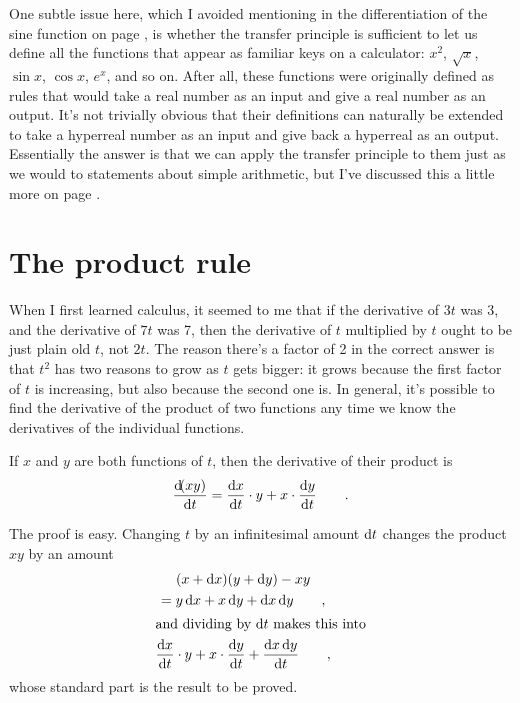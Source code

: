 \label{transcendentals}
One subtle issue here, which I avoided mentioning in the differentiation of the sine function on page \pageref{eg:derivative-of-sin},
is whether the transfer principle is sufficient to let us define all the functions that
appear as familiar keys on a calculator: $x^2$, $\sqrt{x}$, $\sin x$, $\cos x$, $e^x$, and so on.
After all, these functions were originally defined as rules that would take a real number as an input
and give a real number as an output. It's not trivially obvious that their definitions can naturally be extended
to take a hyperreal number as an input and give back a hyperreal as an output. Essentially the answer is that
we can apply the transfer principle to them just as we would to statements about simple arithmetic, but I've discussed
this a little more on page \pageref{detour:transcendentals}.

\section{The product rule}

When I first learned calculus, it seemed to me that if the derivative of $3t$ was $3$, and the derivative of
$7t$ was 7, then the derivative of $t$ multiplied by $t$ ought to be just plain old $t$, not $2t$. The reason there's
a factor of 2 in the correct answer is that $t^2$ has two reasons to grow as $t$ gets bigger: it grows because
the first factor of $t$ is increasing, but also because the second one is. In general, it's possible to find
the derivative of the product of two functions any time we know the derivatives of the individual functions.

\begin{important}
If $x$ and $y$ are both functions of $t$, then the derivative of their product is
\begin{equation*}
  \frac{\operatorname{d\!}(xy)}{\operatorname{d\!} t} = \frac{\operatorname{d\!} x}{\operatorname{d\!} t}\cdot y +  x \cdot \frac{\operatorname{d\!} y}{\operatorname{d\!} t} \qquad .
\end{equation*}
\end{important}

The proof is easy. Changing $t$ by an infinitesimal amount $\operatorname{d\!} t$ changes the product $xy$ by
an amount
\begin{gather*}
  (x+\der x)(y+\der y)-xy \\
      = y\der x + x\der y+\der x\der y \qquad , \\
\intertext{and dividing by $\der t$ makes this into}
      \frac{\der x}{\der t}\cdot y +  x \cdot \frac{\der y}{\der t} + \frac{\der x \der y}{\der t} \qquad ,
\end{gather*}
whose standard part is the result to be proved.

